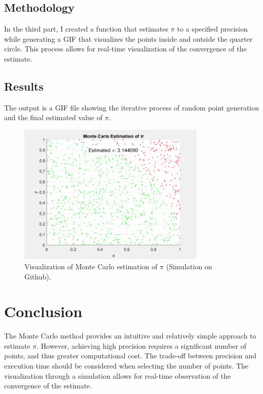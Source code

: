 \documentclass{article}
\begin{document}
\subsection{Methodology}
In the third part, I created a function that estimates $\pi$ to a specified precision while generating a GIF that visualizes the points inside and outside the quarter circle. This process allows for real-time visualization of the convergence of the estimate.

\subsection{Results}
The output is a GIF file showing the iterative process of random point generation and the final estimated value of $\pi$.

\begin{figure}[H]
	\centering
	\includegraphics[width=0.8\textwidth]{Result_Files/monte_carlo_simulation.png}
	\caption{Visualization of Monte Carlo estimation of $\pi$ (Simulation on Github).}
	\label{fig:gif_visualization}
\end{figure}

\section{Conclusion}
The Monte Carlo method provides an intuitive and relatively simple approach to estimate $\pi$. However, achieving high precision requires a significant number of points, and thus greater computational cost. The trade-off between precision and execution time should be considered when selecting the number of points. The visualization through a simulation allows for real-time observation of the convergence of the estimate.
\end{document}
